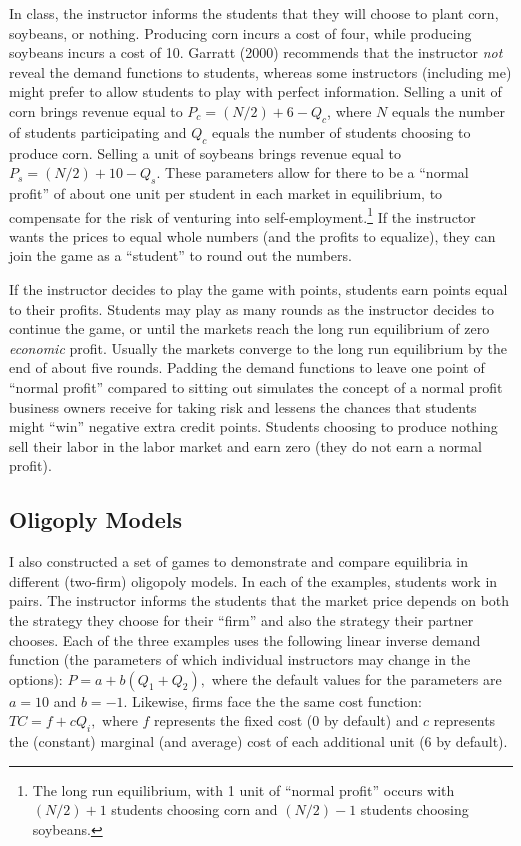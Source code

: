 \documentclass[
]{article}
\begin{document}
In class, the instructor informs the students that they will choose to
plant corn, soybeans, or nothing. Producing corn incurs a cost of four,
while producing soybeans incurs a cost of 10. Garratt (2000) recommends
that the instructor \emph{not} reveal the demand functions to students,
whereas some instructors (including me) might prefer to allow students
to play with perfect information. Selling a unit of corn brings revenue
equal to \(P_c = (N/2) + 6 - Q_c\), where \(N\) equals the number of
students participating and \(Q_c\) equals the number of students
choosing to produce corn. Selling a unit of soybeans brings revenue
equal to \(P_s = (N/2) + 10 - Q_s\). These parameters allow for there to
be a ``normal profit'' of about one unit per student in each market in
equilibrium, to compensate for the risk of venturing into
self-employment.\footnote{The long run equilibrium, with 1 unit of
  ``normal profit'' occurs with \((N/2) + 1\) students choosing corn and
  \((N/2) - 1\) students choosing soybeans.} If the instructor wants the
prices to equal whole numbers (and the profits to equalize), they can
join the game as a ``student'' to round out the numbers.

If the instructor decides to play the game with points, students earn
points equal to their profits. Students may play as many rounds as the
instructor decides to continue the game, or until the markets reach the
long run equilibrium of zero \emph{economic} profit. Usually the markets
converge to the long run equilibrium by the end of about five rounds.
Padding the demand functions to leave one point of ``normal profit''
compared to sitting out simulates the concept of a normal profit
business owners receive for taking risk and lessens the chances that
students might ``win'' negative extra credit points. Students choosing
to produce nothing sell their labor in the labor market and earn zero
(they do not earn a normal profit).

\hypertarget{oligoply-models}{%
\subsection{Oligoply Models}\label{oligoply-models}}

I also constructed a set of games to demonstrate and compare equilibria
in different (two-firm) oligopoly models. In each of the examples,
students work in pairs. The instructor informs the students that the
market price depends on both the strategy they choose for their ``firm''
and also the strategy their partner chooses. Each of the three examples
uses the following linear inverse demand function (the parameters of
which individual instructors may change in the options):
\(P = a + b(Q_1 + Q_2),\) where the default values for the parameters
are \(a = 10\) and \(b = -1\). Likewise, firms face the the same cost
function: \(TC = f + cQ_i,\) where \(f\) represents the fixed cost (0 by
default) and \(c\) represents the (constant) marginal (and average) cost
of each additional unit (6 by default).
\end{document}

